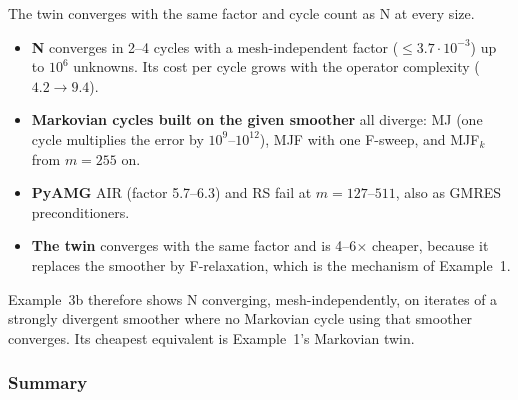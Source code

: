 The twin converges with the same factor and cycle count as N at every size.
\begin{itemize}
  \item \textbf{N} converges in 2--4 cycles with a mesh-independent factor ($\le3.7\cdot10^{-3}$) up to $10^6$
    unknowns. Its cost per cycle grows with the operator complexity ($4.2\to9.4$).
  \item \textbf{Markovian cycles built on the given smoother} all diverge: MJ (one cycle multiplies the error by
    $10^{9}$--$10^{12}$), MJF with one F-sweep, and MJF$_k$ from $m=255$ on.
  \item \textbf{PyAMG} AIR (factor 5.7--6.3) and RS fail at $m=127$--$511$, also as GMRES preconditioners.
  \item \textbf{The twin} converges with the same factor and is 4--6$\times$ cheaper, because it replaces the
    smoother by F-relaxation, which is the mechanism of Example~1.
\end{itemize}
Example~3b therefore shows N converging, mesh-independently, on iterates of a strongly divergent smoother where no
Markovian cycle using that smoother converges. Its cheapest equivalent is Example~1's Markovian twin.

\subsubsection{Summary}\label{sec:num-summary}

\begin{table}[t]
\centering
\caption{What each example shows.}\label{tab:summary}
\end{table}
